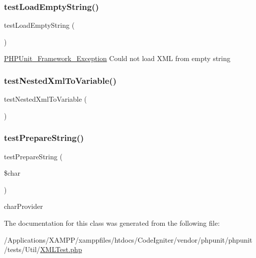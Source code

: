 \subsubsection{\texorpdfstring{test\+Load\+Empty\+String()}{testLoadEmptyString()}}
{\footnotesize\ttfamily test\+Load\+Empty\+String (\begin{DoxyParamCaption}{ }\end{DoxyParamCaption})}

\mbox{\hyperlink{class_p_h_p_unit___framework___exception}{P\+H\+P\+Unit\+\_\+\+Framework\+\_\+\+Exception}}  Could not load X\+ML from empty string \mbox{\label{class_util___x_m_l_test_ac4a6fe05351df12cadf1a98dfdebddd0}} 
\subsubsection{\texorpdfstring{test\+Nested\+Xml\+To\+Variable()}{testNestedXmlToVariable()}}
{\footnotesize\ttfamily test\+Nested\+Xml\+To\+Variable (\begin{DoxyParamCaption}{ }\end{DoxyParamCaption})}

\mbox{\label{class_util___x_m_l_test_a85db052a8b7b19c3d78ae132a248c4d0}} 
\subsubsection{\texorpdfstring{test\+Prepare\+String()}{testPrepareString()}}
{\footnotesize\ttfamily test\+Prepare\+String (\begin{DoxyParamCaption}\item[{}]{\$char }\end{DoxyParamCaption})}

char\+Provider 

The documentation for this class was generated from the following file\+:\begin{DoxyCompactItemize}
\item 
/\+Applications/\+X\+A\+M\+P\+P/xamppfiles/htdocs/\+Code\+Igniter/vendor/phpunit/phpunit/tests/\+Util/\mbox{\hyperlink{phpunit_2tests_2_util_2_x_m_l_test_8php}{X\+M\+L\+Test.\+php}}\end{DoxyCompactItemize}
